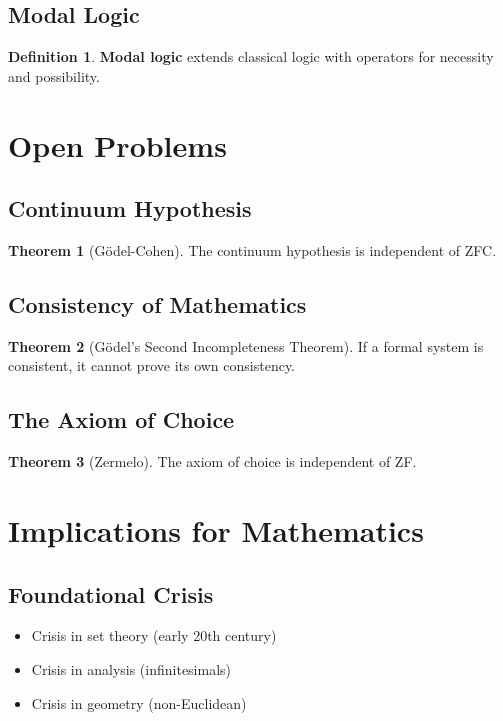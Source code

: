 \documentclass[11pt]{article}
\theoremstyle{definition}
\newtheorem{definition}{Definition}[section]
\newtheorem{theorem}{Theorem}[section]
\begin{document}
\subsection{Modal Logic}
\begin{definition}
\textbf{Modal logic} extends classical logic with operators for necessity and possibility.
\end{definition}

\section{Open Problems}

\subsection{Continuum Hypothesis}
\begin{theorem}[Gödel-Cohen]
The continuum hypothesis is independent of ZFC.
\end{theorem}

\subsection{Consistency of Mathematics}
\begin{theorem}[Gödel's Second Incompleteness Theorem]
If a formal system is consistent, it cannot prove its own consistency.
\end{theorem}

\subsection{The Axiom of Choice}
\begin{theorem}[Zermelo]
The axiom of choice is independent of ZF.
\end{theorem}

\section{Implications for Mathematics}

\subsection{Foundational Crisis}
\begin{itemize}
    \item Crisis in set theory (early 20th century)
    \item Crisis in analysis (infinitesimals)
    \item Crisis in geometry (non-Euclidean)
\end{itemize}
\end{document}
